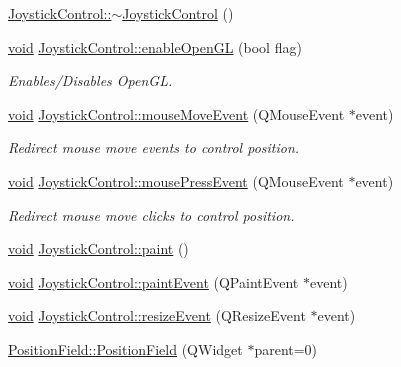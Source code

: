 \begin{DoxyCompactItemize}
\hyperlink{group___g_c_s_control_gadget_plugin_gafb2a1d3ac608e7378bba52d774b825d0}{Joystick\-Control\-::$\sim$\-Joystick\-Control} ()
\item 
\hyperlink{group___u_a_v_objects_plugin_ga444cf2ff3f0ecbe028adce838d373f5c}{void} \hyperlink{group___g_c_s_control_gadget_plugin_ga4737e633732c138c5ad259f7fe0a0e04}{Joystick\-Control\-::enable\-Open\-G\-L} (bool flag)
\begin{DoxyCompactList}\small\item\em Enables/\-Disables Open\-G\-L. \end{DoxyCompactList}\item 
\hyperlink{group___u_a_v_objects_plugin_ga444cf2ff3f0ecbe028adce838d373f5c}{void} \hyperlink{group___g_c_s_control_gadget_plugin_ga4522aafc5f2b7dae7d64ac4368189272}{Joystick\-Control\-::mouse\-Move\-Event} (Q\-Mouse\-Event $\ast$event)
\begin{DoxyCompactList}\small\item\em Redirect mouse move events to control position. \end{DoxyCompactList}\item 
\hyperlink{group___u_a_v_objects_plugin_ga444cf2ff3f0ecbe028adce838d373f5c}{void} \hyperlink{group___g_c_s_control_gadget_plugin_ga8d3df6f8f57869a8e862f3844766ad72}{Joystick\-Control\-::mouse\-Press\-Event} (Q\-Mouse\-Event $\ast$event)
\begin{DoxyCompactList}\small\item\em Redirect mouse move clicks to control position. \end{DoxyCompactList}\item 
\hyperlink{group___u_a_v_objects_plugin_ga444cf2ff3f0ecbe028adce838d373f5c}{void} \hyperlink{group___g_c_s_control_gadget_plugin_gaf79331833d41cf9af3b151a0f18663e0}{Joystick\-Control\-::paint} ()
\item 
\hyperlink{group___u_a_v_objects_plugin_ga444cf2ff3f0ecbe028adce838d373f5c}{void} \hyperlink{group___g_c_s_control_gadget_plugin_ga10ed4b7da97f80c638a3eec5a81344c8}{Joystick\-Control\-::paint\-Event} (Q\-Paint\-Event $\ast$event)
\item 
\hyperlink{group___u_a_v_objects_plugin_ga444cf2ff3f0ecbe028adce838d373f5c}{void} \hyperlink{group___g_c_s_control_gadget_plugin_gaae12f9fa1f0456ecc47b044a2b2db9da}{Joystick\-Control\-::resize\-Event} (Q\-Resize\-Event $\ast$event)
\item 
\hyperlink{group___g_c_s_control_gadget_plugin_ga41712deeb21d497420f784aacbf72e29}{Position\-Field\-::\-Position\-Field} (Q\-Widget $\ast$parent=0)

\end{DoxyCompactItemize}
